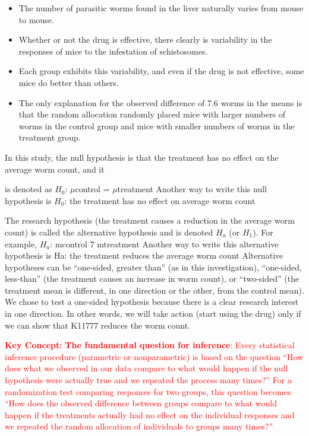 \documentclass[
]{report}
\providecommand{\tightlist}{%
  \setlength{\itemsep}{0pt}\setlength{\parskip}{0pt}}
\begin{document}
\begin{itemize}
\tightlist
\item
  The number of parasitic worms found in the liver naturally varies from mouse to mouse.
\item
  Whether or not the drug is effective, there clearly is variability in the responses of mice to the infestation
  of schistosomes.
\item
  Each group exhibits this variability, and even if the drug is not effective, some mice do better than
  others.
\item
  The only explanation for the observed difference of 7.6 worms in the means is that the random
  allocation randomly placed mice with larger numbers of worms in the control group and mice with
  smaller numbers of worms in the treatment group.
\end{itemize}

In this study, the null hypothesis is that the treatment has no effect on the average worm count, and it

is denoted as
\textbar{} \(H_0\): \(\mu\)control = \(\mu\)treatment
Another way to write this null hypothesis is
\(H_0\): the treatment has no effect on average worm count

The research hypothesis (the treatment causes a reduction in the average worm count) is called the alternative
hypothesis and is denoted \(H_a\) (or \(H_1\)). For example,
\(H_a\): mcontrol 7 mtreatment
Another way to write this alternative hypothesis is
Ha: the treatment reduces the average worm count
Alternative hypotheses can be ``one-sided, greater than'' (as in this investigation), ``one-sided, less-than''
(the treatment causes an increase in worm count), or ``two-sided'' (the treatment mean is different, in one
direction or the other, from the control mean). We chose to test a one-sided hypothesis because there is a
clear research interest in one direction. In other words, we will take action (start using the drug) only if we
can show that K11777 reduces the worm count.

\Large

\textbf{\textcolor{red}{Key Concept:}}
\textcolor{red}{\textbf{The fundamental question for inference}: Every statistical inference procedure (parametric or nonparametric) is based on the question “How does what we observed in our data compare to what
would happen if the null hypothesis were actually true and we repeated the process many times?”
For a randomization test comparing responses for two groups, this question becomes “How does
the observed difference between groups compare to what would happen if the treatments actually
had no effect on the individual responses and we repeated the random allocation of individuals to
groups many times?”}
\end{document}
